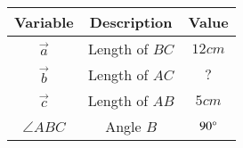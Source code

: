 \begin{center}
    \begin{tabular}{|c|c|c|} 
        \hline
            \textbf{Variable} & \textbf{Description} & \textbf{Value} \\ 
        \hline
            $\vec{a}$    & Length of $BC$ & $12cm$ \\ 
        \hline
            $\vec{b}$    & Length of $AC$ & $?$\\ 
        \hline
            $\vec{c}$    & Length of $AB$ & $5cm$\\
            \hline
            $\angle{ABC}$& Angle $B$      & $90\degree$\\
        \hline
    \end{tabular}
\end{center}
